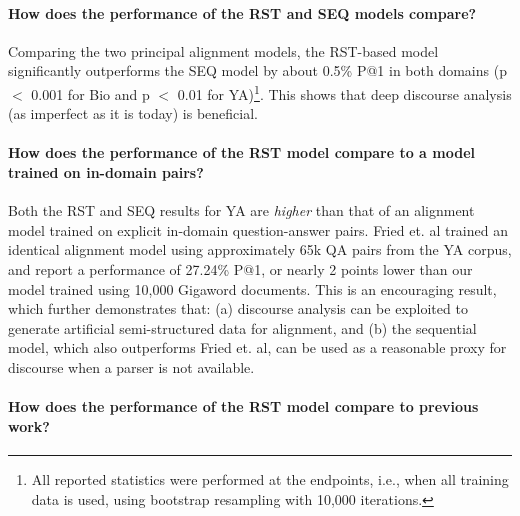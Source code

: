 \paragraph{How does the performance of the RST and SEQ models compare?}
Comparing the two principal alignment models, the RST-based model significantly outperforms the SEQ model by about 0.5\% P@1 in both domains (p $<$ 0.001 for Bio and p $<$ 0.01 for YA)\footnote{All reported statistics were performed at the endpoints, i.e., when all training data is used, using bootstrap resampling with 10,000 iterations.}. This shows that deep discourse analysis (as imperfect as it is today) is beneficial. 

\paragraph{How does the performance of the RST model compare to a model trained on in-domain pairs?}

Both the RST and SEQ results for YA are {\em higher} than that of an alignment model trained on explicit in-domain question-answer pairs. Fried et. al  trained an identical alignment model using approximately 65k QA pairs from the YA corpus, and report a performance of 27.24\% P@1, or nearly 2 points lower than our model trained using 10,000 Gigaword documents. This is an encouraging result, which further demonstrates that: (a) discourse analysis can be exploited to generate artificial semi-structured data for alignment, and (b) the sequential model, which also outperforms Fried et. al, can be used as a reasonable proxy for discourse when a parser is not available. 


\paragraph{How does the performance of the RST model compare to previous work?}

